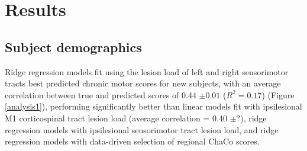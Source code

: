 \documentclass[10pt]{article}
\begin{document}
\section{Results}
\subsection*{Subject demographics}



Ridge regression models fit using the lesion load of left and right sensorimotor tracts best predicted chronic motor scores for new subjects, with an average correlation between true and predicted scores of 0.44 $\pm 0.01$ ($R^2 = 0.17$) (Figure \ref{analysis1}), performing significantly better than linear models fit with ipsilesional M1 corticospinal tract lesion load (average correlation = 0.40 $\pm ?$), ridge regression models with ipsilesional sensorimotor tract lesion load, and ridge regression models with data-driven selection of regional ChaCo scores.
\end{document}
